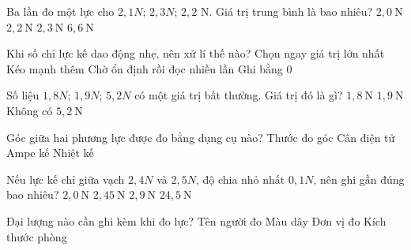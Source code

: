 \begin{ex}
Ba lần đo một lực cho $2{,}1N$; $2{,}3N$; $2{,}2$ N. Giá trị trung bình là bao nhiêu?
\choice
{$2,0\ \mathrm{N}$}
{\True $2,2\ \mathrm{N}$}
{$2,3\ \mathrm{N}$}
{$6,6\ \mathrm{N}$}
\end{ex}

\begin{ex}
Khi số chỉ lực kế dao động nhẹ, nên xử lí thế nào?
\choice
{Chọn ngay giá trị lớn nhất}
{Kéo mạnh thêm}
{\True Chờ ổn định rồi đọc nhiều lần}
{Ghi bằng 0}
\end{ex}

\begin{ex}
Số liệu $1{,}8N$; $1{,}9N$; $5{,}2N$ có một giá trị bất thường. Giá trị đó là gì?
\choice
{$1,8\ \mathrm{N}$}
{$1,9\ \mathrm{N}$}
{Không có}
{\True $5,2\ \mathrm{N}$}
\end{ex}

\begin{ex}
Góc giữa hai phương lực được đo bằng dụng cụ nào?
\choice
{\True Thước đo góc}
{Cân điện tử}
{Ampe kế}
{Nhiệt kế}
\end{ex}

\begin{ex}
Nếu lực kế chỉ giữa vạch $2{,}4N$ và $2{,}5N$, độ chia nhỏ nhất $0{,}1N$, nên ghi gần đúng bao nhiêu?
\choice
{$2,0\ \mathrm{N}$}
{\True $2,45\ \mathrm{N}$}
{$2,9\ \mathrm{N}$}
{$24,5\ \mathrm{N}$}
\end{ex}

\begin{ex}
Đại lượng nào cần ghi kèm khi đo lực?
\choice
{Tên người đo}
{Màu dây}
{\True Đơn vị đo}
{Kích thước phòng}
\end{ex}

